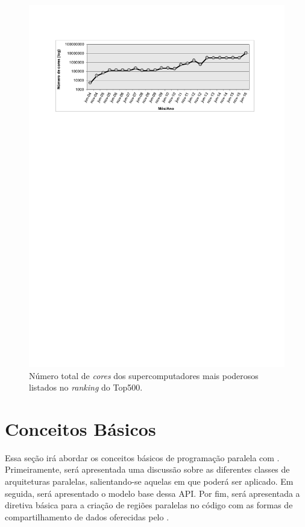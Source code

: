 \documentclass{SBCbookchapter}
\begin{document}
	\begin{figure}[t]
		\centering
		\includegraphics[width=\linewidth]{img/cores-top500.pdf}
		\caption{Número total de \textit{cores} dos supercomputadores
		mais poderosos listados no \textit{ranking} do Top500.}
		\label{fig:top500}
	\end{figure}


\section{Conceitos Básicos}
\label{sec:conceitos basicos}

	Essa seção irá abordar os conceitos básicos de programação paralela
	com \openmp. Primeiramente, será apresentada uma discussão sobre as
	diferentes classes de arquiteturas paralelas, salientando-se aquelas
	em que \openmp poderá ser aplicado. Em seguida, será apresentado o
	modelo base dessa API.  Por fim, será apresentada a diretiva básica
	para a criação de regiões paralelas no código com as formas de
	compartilhamento de dados oferecidas pelo \openmp.
\end{document}

